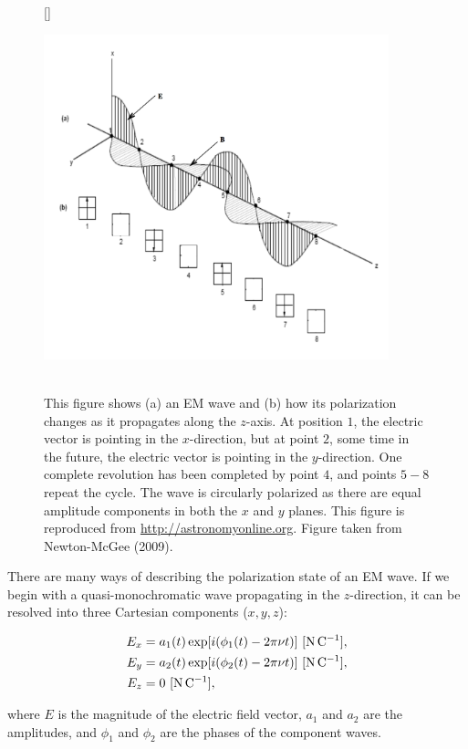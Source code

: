\documentclass[a4paper,10pt]{article}
\begin{document}
\begin{figure}[h]
    [\FBwidth]
    {\caption{\footnotesize{\\This figure shows (a) an EM wave and (b) how its polarization changes as it propagates along the $z$-axis. At position $1$, the electric vector is pointing in the $x$-direction, but at point $2$, some time in the future, the electric vector is pointing in the $y$-direction. One complete revolution has been completed by point $4$, and points $5-8$ repeat the cycle. The wave is circularly polarized as there are equal amplitude components in both the $x$ and $y$ planes. This figure is reproduced from \href{http://astronomyonline.org}{http://astronomyonline.org}. Figure taken from Newton-McGee (2009).}}
    \label{fig:empol}}
    {\includegraphics[width=10cm]{figures/EMpol.png}}
\end{figure}

{\noindent}There are many ways of describing the polarization state of an EM wave. If we begin with a quasi-monochromatic wave propagating in the $z$-direction, it can be resolved into three Cartesian components ($x,y,z$):

\begin{align*}
    E_x &= a_1(t)\exp[i(\phi_1(t)-2\pi\nu t)] ~ [{\rm N\,C^{-1}}], \\
    E_y &= a_2(t)\exp[i(\phi_2(t)-2\pi\nu t)] ~ [{\rm N\,C^{-1}}], \\
    E_z &= 0 ~ [{\rm N\,C^{-1}}],
\end{align*}

{\noindent}where $E$ is the magnitude of the electric field vector, $a_1$ and $a_2$ are the amplitudes, and $\phi_1$ and $\phi_2$ are the phases of the component waves.
\end{document}
